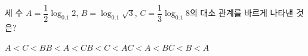 세 수 $A=\dfrac{1}{2}\log_{0.1} 2$, $B=\log_{0.1} \sqrt{3}$, $C=\dfrac{1}{3}\log_{0.1} 8$의 대소 관계를 바르게 나타낸 것은?
\begin{choices32}{$A<C<B$}{$B<A<C$}{$B<C<A$}{$C<A<B$}{$C<B<A$}\end{choices32}

